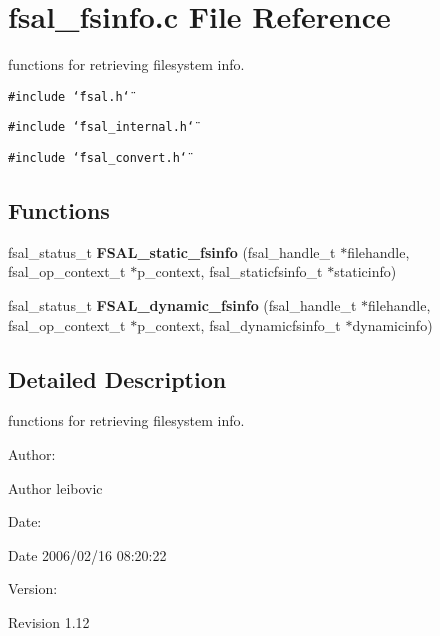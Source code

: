 \section{fsal\_\-fsinfo.c File Reference}
\label{fsal__fsinfo_8c}
functions for retrieving filesystem info. 

{\tt \#include \char`\"{}fsal.h\char`\"{}}\par
{\tt \#include \char`\"{}fsal\_\-internal.h\char`\"{}}\par
{\tt \#include \char`\"{}fsal\_\-convert.h\char`\"{}}\par
\subsection*{Functions}
\begin{CompactItemize}
\item 
fsal\_\-status\_\-t {\bf FSAL\_\-static\_\-fsinfo} (fsal\_\-handle\_\-t $\ast$filehandle, fsal\_\-op\_\-context\_\-t $\ast$p\_\-context, fsal\_\-staticfsinfo\_\-t $\ast$staticinfo)
\item 
fsal\_\-status\_\-t {\bf FSAL\_\-dynamic\_\-fsinfo} (fsal\_\-handle\_\-t $\ast$filehandle, fsal\_\-op\_\-context\_\-t $\ast$p\_\-context, fsal\_\-dynamicfsinfo\_\-t $\ast$dynamicinfo)
\end{CompactItemize}


\subsection{Detailed Description}
functions for retrieving filesystem info. 

\begin{Desc}
\item[Author:]\begin{Desc}
\item[Author]leibovic \end{Desc}
\end{Desc}
\begin{Desc}
\item[Date:]\begin{Desc}
\item[Date]2006/02/16 08:20:22 \end{Desc}
\end{Desc}
\begin{Desc}
\item[Version:]\begin{Desc}
\item[Revision]1.12 \end{Desc}
\end{Desc}


